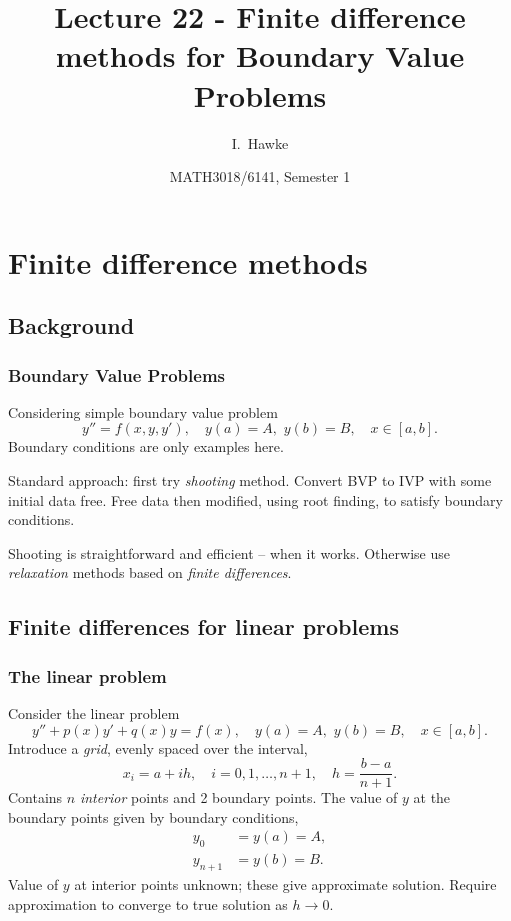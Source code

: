 \documentclass{beamer}
\title[Lecture 22] %
{Lecture 22 - Finite difference methods for Boundary Value Problems}
\author[I. Hawke] %
{I.~Hawke}
\institute[University of Southampton] %
{
  School of Mathematics, \\
  University of Southampton, UK
}
\date[Semester 1] %
{MATH3018/6141, Semester 1}
\begin{document}
\begin{frame}
  \titlepage
\end{frame}

\section{Finite difference methods}

\subsection{Background}

\begin{frame}
  \frametitle{Boundary Value Problems}

  Considering simple boundary value problem
  \begin{equation*}
    y'' = f(x, y, y'), \quad y(a) = A, \,\, y(b) = B, \quad x \in [a,b].
  \end{equation*} \pause
  Boundary conditions are only examples here. \pause

  \vspace{1ex}

  Standard approach: first try \emph{shooting} method.  Convert BVP to
  IVP with some initial data free. Free data then modified, using root
  finding, to satisfy boundary conditions. \pause

  \vspace{1ex}

  Shooting is straightforward and efficient -- when it
  works. Otherwise use \emph{relaxation} methods based on \emph{finite
    differences}.

\end{frame}


\subsection{Finite differences for linear problems}

\begin{frame}
  \frametitle{The linear problem}

  Consider the linear problem
  \begin{equation*}
    y'' + p(x) y' + q(x) y =  f(x), \quad y(a) = A, \,\, y(b) = B,
    \quad x \in [a,b].
  \end{equation*} \pause
  Introduce a \emph{grid}, evenly spaced over the interval,
  \begin{equation*}
    x_i = a + i h, \quad i = 0, 1, \dots, n + 1, \quad h = \frac{b -
      a}{n + 1}.
  \end{equation*}
  Contains $n$ \emph{interior} points and 2 boundary points.
  \pause The value of $y$ at the boundary points given by
  boundary conditions,
  \begin{align*}
    y_0 & = y(a) = A, \\
    y_{n+1} & = y(b) = B.
  \end{align*} \pause
  Value of $y$ at interior points unknown; these
  give approximate solution. Require approximation to converge to
  true solution as $h \rightarrow 0$.

\end{frame}
\end{document}
